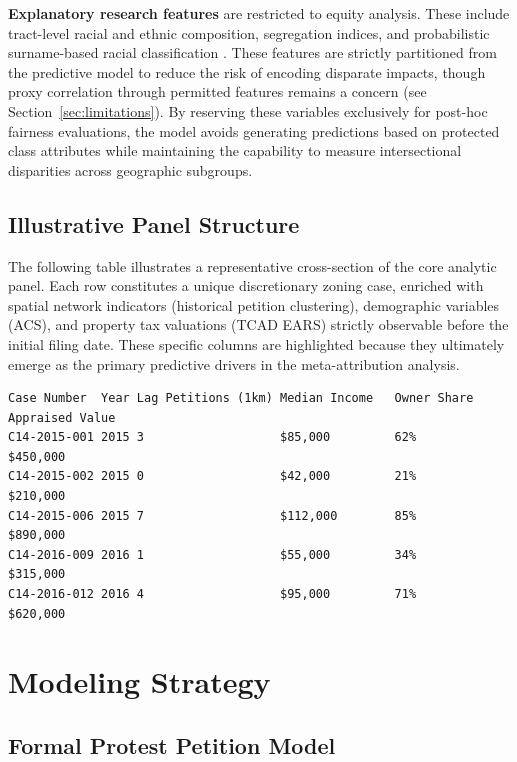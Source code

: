 \documentclass[11pt, letterpaper]{article}
\begin{document}
\textbf{Explanatory research features} are restricted to equity analysis. These include tract-level racial and ethnic composition, segregation indices, and probabilistic surname-based racial classification \cite{sood2018ethnicolr}. These features are strictly partitioned from the predictive model to reduce the risk of encoding disparate impacts, though proxy correlation through permitted features remains a concern (see Section~\ref{sec:limitations}). By reserving these variables exclusively for post-hoc fairness evaluations, the model avoids generating predictions based on protected class attributes while maintaining the capability to measure intersectional disparities across geographic subgroups.

\subsection{Illustrative Panel Structure}
\label{sec:panel}

\noindent The following table illustrates a representative cross-section of the core analytic panel. Each row constitutes a unique discretionary zoning case, enriched with spatial network indicators (historical petition clustering), demographic variables (ACS), and property tax valuations (TCAD EARS) strictly observable before the initial filing date. These specific columns are highlighted because they ultimately emerge as the primary predictive drivers in the meta-attribution analysis.

\vspace{1em}
{\small
\begin{verbatim}
Case Number  Year Lag Petitions (1km) Median Income   Owner Share   Appraised Value 
C14-2015-001 2015 3                   $85,000         62%           $450,000        
C14-2015-002 2015 0                   $42,000         21%           $210,000        
C14-2015-006 2015 7                   $112,000        85%           $890,000        
C14-2016-009 2016 1                   $55,000         34%           $315,000        
C14-2016-012 2016 4                   $95,000         71%           $620,000        
\end{verbatim}
}


\section{Modeling Strategy}

\subsection{Formal Protest Petition Model}
\end{document}

